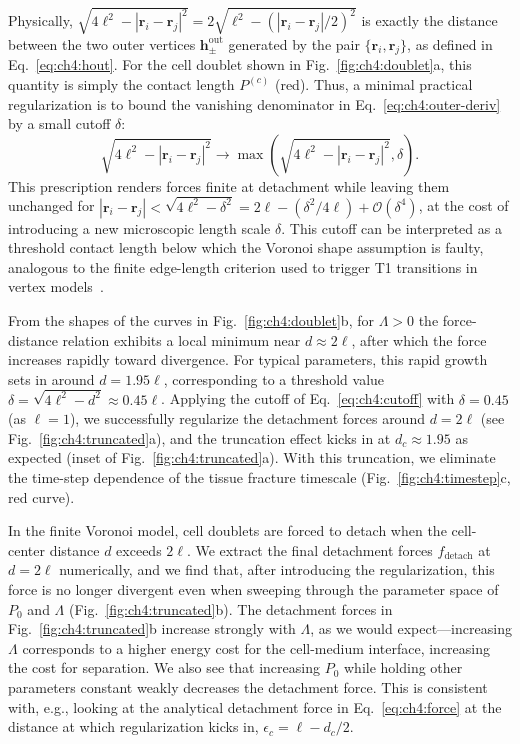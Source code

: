 Physically, $\sqrt{4\ell^2-|\mathbf{r}_i-\mathbf{r}_j|^2}=2\sqrt{\ell^2-(|\mathbf{r}_i-\mathbf{r}_j|/2)^2}$ is exactly the distance between the two outer vertices $\mathbf{h}^\textrm{out}_{\pm}$ generated by the pair $\{\mathbf{r}_i,\mathbf{r}_j\}$, as defined in Eq.~\eqref{eq:ch4:hout}.
For the cell doublet shown in Fig.~\ref{fig:ch4:doublet}a, this quantity is simply the contact length $P^{(c)}$ (red).
Thus, a minimal practical regularization is to bound the vanishing denominator in Eq.~\eqref{eq:ch4:outer-deriv} by a small cutoff $\delta$:
\begin{equation}
\label{eq:ch4:cutoff}
    \sqrt{4\ell^2-|\mathbf{r}_i-\mathbf{r}_j|^2} \to \max\left(\sqrt{4\ell^2-|\mathbf{r}_i-\mathbf{r}_j|^2},\delta\right).
\end{equation}
This prescription renders forces finite at detachment while leaving them unchanged for $|\mathbf{r}_i-\mathbf{r}_j|<\sqrt{4\ell^2-\delta^2}=2\ell-(\delta^2/4\ell)+\mathcal{O}(\delta^4)$, at the cost of introducing a new microscopic length scale $\delta$. This cutoff can be interpreted as a threshold contact length below which the Voronoi shape assumption is faulty, analogous to the finite edge-length criterion used to trigger T1 transitions in vertex models~\cite{chen2022activation, bi2015density, fletcher2014vertex, spahn2013vertex}.


From the shapes of the curves in Fig.~\ref{fig:ch4:doublet}b, for $\Lambda>0$ the force-distance relation exhibits a local minimum near $d\approx2\ell$, after which the force increases rapidly toward divergence.
For typical parameters, this rapid growth sets in around $d=1.95\ell$, corresponding to a threshold value $\delta=\sqrt{4\ell^2-d^2}\approx 0.45\ell$.
Applying the cutoff of Eq.~\eqref{eq:ch4:cutoff} with $\delta = 0.45$ (as $\ell = 1$), we successfully regularize the detachment forces around $d=2\ell$ (see Fig.~\ref{fig:ch4:truncated}a), and the truncation effect kicks in at $d_c\approx1.95$ as expected (inset of Fig.~\ref{fig:ch4:truncated}a). With this truncation, we eliminate the time-step dependence of the tissue fracture timescale (Fig.~\ref{fig:ch4:timestep}c, red curve).

In the finite Voronoi model, cell doublets are forced to detach when the cell-center distance $d$ exceeds $2\ell$. We extract the final detachment forces $f_\textrm{detach}$ at $d=2\ell$ numerically, and we find that, after introducing the regularization, this force is no longer divergent even when sweeping through the parameter space of $P_0$ and $\Lambda$ (Fig.~\ref{fig:ch4:truncated}b). The detachment forces in Fig.~\ref{fig:ch4:truncated}b increase strongly with $\Lambda$, as we would expect---increasing $\Lambda$ corresponds to a higher energy cost for the cell-medium interface, increasing the cost for separation. We also see that increasing $P_0$ while holding other parameters constant weakly decreases the detachment force. This is consistent with, e.g., looking at the analytical detachment force in Eq.~\eqref{eq:ch4:force} at the distance at which regularization kicks in, $\epsilon_c = \ell - d_c/2$.

